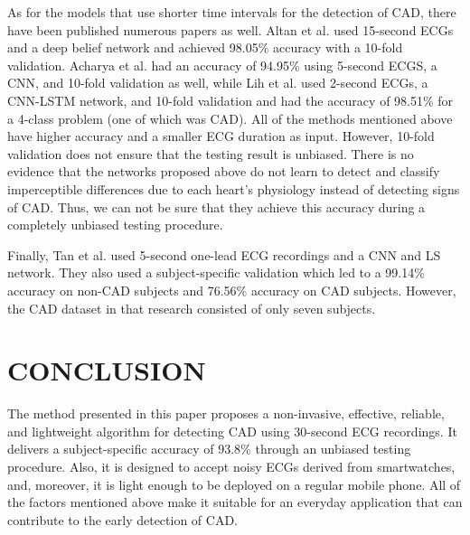 As for the models that use shorter time intervals for the detection of CAD, there have been published numerous papers as well. Altan et al. \cite{altan} used 15-second ECGs and a deep belief network and achieved 98.05\% accuracy with a 10-fold validation. Acharya et al. \cite{acharya} had an accuracy of 94.95\% using 5-second ECGS, a CNN, and 10-fold validation as well, while Lih et al. \cite{lih} used 2-second ECGs, a CNN-LSTM network, and 10-fold validation and had the accuracy of 98.51\% for a 4-class problem (one of which was CAD). All of the methods mentioned above have higher accuracy and a smaller ECG duration as input. However, 10-fold validation does not ensure that the testing result is unbiased. There is no evidence that the networks proposed above do not learn to detect and classify imperceptible differences due to each heart's physiology instead of detecting signs of CAD. Thus, we can not be sure that they achieve this accuracy during a completely unbiased testing procedure.

Finally, Tan et al. \cite{tan} used 5-second one-lead ECG recordings and a CNN and LS network. They also used a subject-specific validation which led to a 99.14\% accuracy on non-CAD subjects and 76.56\% accuracy on CAD subjects. However, the CAD dataset in that research consisted of only seven subjects.

\section{CONCLUSION}
\label{sec:conclusion}

The method presented in this paper proposes a non-invasive, effective, reliable, and lightweight algorithm for detecting CAD using 30-second ECG recordings. It delivers a subject-specific accuracy of 93.8\% through an unbiased testing procedure. Also, it is designed to accept noisy ECGs derived from smartwatches, and, moreover, it is light enough to be deployed on a regular mobile phone. All of the factors mentioned above make it suitable for an everyday application that can contribute to the early detection of CAD.

\vfill\pagebreak





